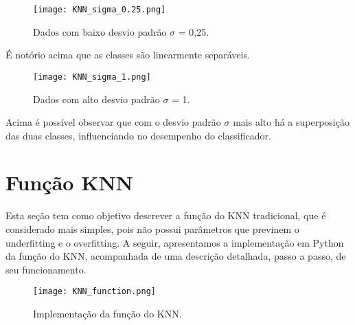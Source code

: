 \documentclass{article} %
\begin{document}
\vspace{1cm}

\begin{figure}[h] %
    \centering %
    \texttt{[image: KNN\_sigma\_0.25.png]} %
    \caption{Dados com baixo desvio padrão $\sigma$ = 0,25.} %
    \label{fig:exemplo} %
\end{figure}

\vspace{1cm}

É notório acima que as classes são linearmente separáveis.

\vspace{1cm}

\begin{figure}[h] %
    \centering %
    \texttt{[image: KNN\_sigma\_1.png]} %
    \caption{Dados com alto desvio padrão $\sigma$ = 1.} %
    \label{fig:exemplo} %
\end{figure}

\vspace{1cm}

Acima é possível observar que com o desvio padrão $\sigma$  mais alto há a superposição das duas classes, influenciando no desempenho do classificador.

\section{Função KNN}

Esta seção tem como objetivo descrever a função do KNN tradicional, que é considerado mais simples, pois não possui parâmetros que previnem o underfitting e o overfitting. A seguir, apresentamos a implementação em Python da função do KNN, acompanhada de uma descrição detalhada, passo a passo, de seu funcionamento.

\vspace{1cm}

\begin{figure}[h] %
    \centering %
    \texttt{[image: KNN\_function.png]} %
    \caption{Implementação da função do KNN.} %
    \label{fig:exemplo} %
\end{figure}
\end{document}
